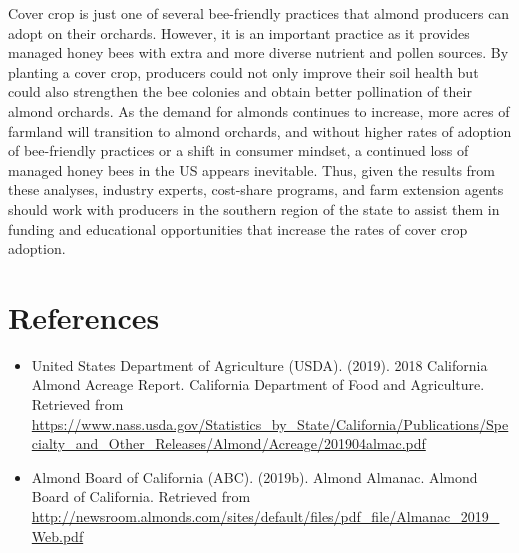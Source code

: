 \documentclass[12pt,]{article}
\begin{document}
Cover crop is just one of several bee-friendly practices that almond
producers can adopt on their orchards. However, it is an important
practice as it provides managed honey bees with extra and more diverse
nutrient and pollen sources. By planting a cover crop, producers could
not only improve their soil health but could also strengthen the bee
colonies and obtain better pollination of their almond orchards. As the
demand for almonds continues to increase, more acres of farmland will
transition to almond orchards, and without higher rates of adoption of
bee-friendly practices or a shift in consumer mindset, a continued loss
of managed honey bees in the US appears inevitable. Thus, given the
results from these analyses, industry experts, cost-share programs, and
farm extension agents should work with producers in the southern region
of the state to assist them in funding and educational opportunities
that increase the rates of cover crop adoption.

\newpage

\section{References}\label{references}

\begin{itemize}
\item
  United States Department of Agriculture (USDA). (2019). 2018
  California Almond Acreage Report. California Department of Food and
  Agriculture. Retrieved from
  \url{https://www.nass.usda.gov/Statistics_by_State/California/Publications/Specialty_and_Other_Releases/Almond/Acreage/201904almac.pdf}
\item
  Almond Board of California (ABC). (2019b). Almond Almanac. Almond
  Board of California. Retrieved from
  \url{http://newsroom.almonds.com/sites/default/files/pdf_file/Almanac_2019_Web.pdf}
\end{itemize}
\end{document}

